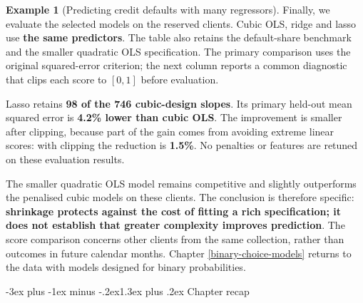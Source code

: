 \documentclass[
  11pt,
]{book}
\makeatletter
\renewcommand\section{\@startsection{section}{1}{\z@}
  {-3ex plus -1ex minus -.2ex}{1.3ex plus .2ex}
  {\normalfont\Large\bfseries\color{TextbookInk}}}
\theoremstyle{definition}
\theoremstyle{definition}
\newtheorem{example}{Example}[chapter]
\theoremstyle{definition}
\theoremstyle{definition}
\theoremstyle{remark}
\makeatother
\begin{document}
\begin{example}[Predicting credit defaults with many regressors]
Finally, we evaluate the selected models on the reserved clients. Cubic OLS, ridge and lasso use \textbf{the same predictors}. The table also retains the default-share benchmark and the smaller quadratic OLS specification. The primary comparison uses the original squared-error criterion; the next column reports a common diagnostic that clips each score to \([0,1]\) before evaluation.

\begin{table}[H]
\centering\begingroup\fontsize{10}{12}\selectfont

\endgroup{}
\end{table}

Lasso retains \textbf{98 of the 746 cubic-design slopes}. Its primary held-out mean squared error is \textbf{4.2\% lower than cubic OLS}. The improvement is smaller after clipping, because part of the gain comes from avoiding extreme linear scores: with clipping the reduction is \textbf{1.5\%}. No penalties or features are retuned on these evaluation results.

The smaller quadratic OLS model remains competitive and slightly outperforms the penalised cubic models on these clients. The conclusion is therefore specific: \textbf{shrinkage protects against the cost of fitting a rich specification; it does not establish that greater complexity improves prediction}. The score comparison concerns other clients from the same collection, rather than outcomes in future calendar months. Chapter \ref{binary-choice-models} returns to the data with models designed for binary probabilities.
\end{example}


\section{Chapter recap}\label{regressions-recap}
\end{document}
